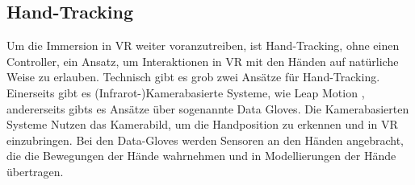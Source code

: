 \subsection{Hand-Tracking}
Um die Immersion in VR weiter voranzutreiben, ist Hand-Tracking, ohne einen Controller, ein Ansatz, um Interaktionen in VR mit den Händen auf natürliche Weise zu erlauben. 
Technisch gibt es grob zwei Ansätze für Hand-Tracking. Einerseits gibt es (Infrarot-)Kamerabasierte Systeme, wie Leap Motion \cite{Leap.2014}, andererseits gibts es Ansätze über sogenannte Data Gloves\cite{S.Lee.2017}. Die Kamerabasierten Systeme Nutzen das Kamerabild, um die Handposition zu erkennen und in VR einzubringen. Bei den Data-Gloves werden Sensoren an den Händen angebracht, die die Bewegungen der Hände wahrnehmen und in Modellierungen der Hände übertragen. 

